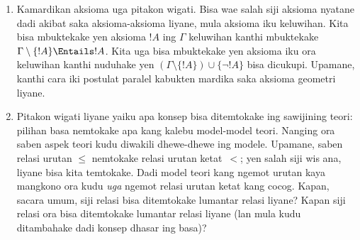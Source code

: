 \documentclass[../../../include/open-logic-section]{subfiles}
\begin{document}
\begin{explain}
\begin{enumerate}
  prakara iki ora kedadeyan kanthi nemokake
  model saka~$\Gamma$. Yen teori kita nduweni
  model, kita bisa nggunakake metode logis
  kanggo nliti model-model kasebut, lan uga
  kanggo mbangun model.
\item Kamardikan aksioma uga pitakon wigati.
  Bisa wae salah siji aksioma nyatane dadi
  akibat saka aksioma-aksioma liyane,
  mula aksioma iku keluwihan. Kita bisa
  mbuktekake yen aksioma $!A$ ing $\Gamma$
  keluwihan kanthi mbuktekake $\Gamma \setminus
  \{!A\} \Entails !A$. Kita uga bisa
  mbuktekake yen aksioma iku ora keluwihan
  kanthi nuduhake yen $(\Gamma \setminus \{!A\})
  \cup \{\lnot !A\}$ bisa dicukupi. Upamane,
  kanthi cara iki postulat paralel kabukten
  mardika saka aksioma geometri liyane.
\item Pitakon wigati liyane yaiku apa konsep
  bisa ditemtokake ing sawijining teori:
  pilihan basa nemtokake apa kang kalebu
  model-model teori. Nanging ora saben
  aspek teori kudu diwakili dhewe-dhewe
  ing modele. Upamane, saben relasi urutan
  $\le$ nemtokake relasi urutan ketat~$<$;
  yen salah siji wis ana, liyane bisa kita
  temtokake. Dadi model teori kang ngemot
  urutan kaya mangkono ora kudu \emph{uga}
  ngemot relasi urutan ketat kang cocog.
  Kapan, sacara umum, siji relasi bisa
  ditemtokake lumantar relasi liyane?
  Kapan siji relasi ora bisa ditemtokake
  lumantar relasi liyane (lan mula kudu
  ditambahake dadi konsep dhasar ing basa)?
\end{enumerate}
\end{explain}
\end{document}
